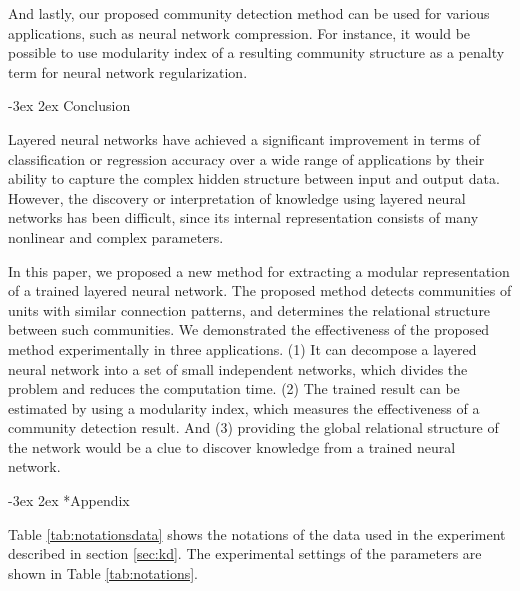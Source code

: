 \documentclass[12pt]{article} %
\makeatletter
\renewcommand\section{\@startsection {section}{1}%
{\z@}%
{-3ex}%
{2ex}%
{\normalfont\normalsize\bfseries}}
\makeatother
\begin{document}
And lastly, our proposed community detection method can be used for various applications, such as neural network compression. For instance, it would be possible to use modularity index of a resulting community structure as a penalty term for neural network regularization. 

\section{Conclusion} %
\label{sec:conclusion}

Layered neural networks have achieved a significant improvement in terms of classification or regression accuracy over a wide range of applications by their ability to capture the complex hidden structure between input and output data. However, the discovery or interpretation of knowledge using layered neural networks has been difficult, since its internal representation consists of many nonlinear and complex parameters. 

In this paper, we proposed a new method for extracting a modular representation of a trained layered neural network. The proposed method detects communities of units with similar connection patterns, and determines the relational structure between such communities. We demonstrated the effectiveness of the proposed method experimentally in three applications. (1) It can decompose a layered neural network into a set of small independent networks, which divides the problem and reduces the computation time. (2) The trained result can be estimated by using a modularity index, which measures the effectiveness of a community detection result. And (3) providing the global relational structure of the network would be a clue to discover knowledge from a trained neural network. 

\section*{Appendix} %
\label{sec:appendix}

Table \ref{tab:notationsdata} shows the notations of the data \cite{estat} used in the experiment described in section \ref{sec:kd}. The experimental settings of the parameters are shown in Table \ref{tab:notations}. 
\end{document}
